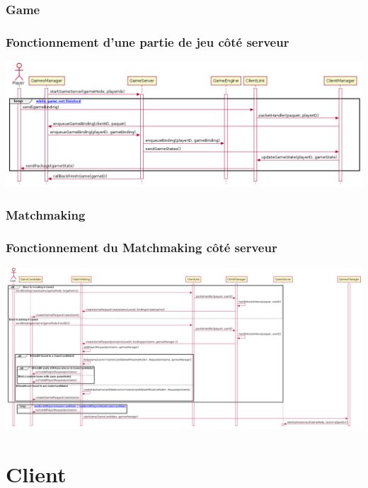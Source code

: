 \documentclass{beamer}
\begin{document}
\subsubsection{Game}
\begin{frame}
\frametitle{Fonctionnement d'une partie de jeu côté serveur}

\includegraphics[width=1\textwidth]{../../res/uml/sequence/GameServerSequence.png}
\end{frame}

\subsubsection{Matchmaking}
\begin{frame}
\frametitle{Fonctionnement du Matchmaking côté serveur}

\includegraphics[width=1\textwidth]{../../res/uml/sequence/MatchMakingServerSequence.png}
\end{frame}

\section{Client}


%
\end{document}
